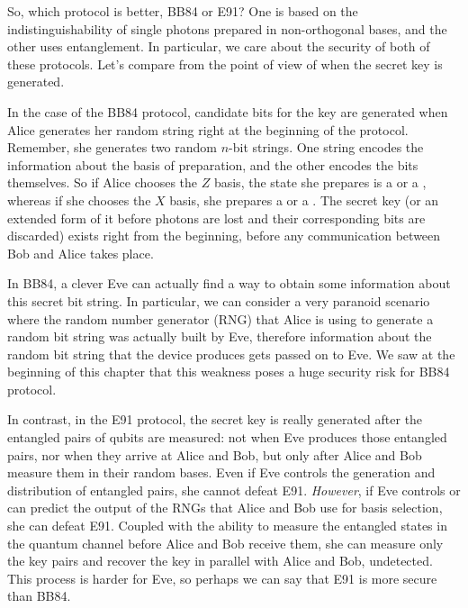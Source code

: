 So, which protocol is better, BB84 or E91?
One is based on the indistinguishability of single photons prepared in non-orthogonal bases, and the other uses entanglement.
In particular, we care about the security of both of these protocols. Let's compare from the point of view of when the secret key is generated.

In the case of the BB84 protocol, candidate bits for the key are generated when Alice generates her random string right at the beginning of the protocol.
Remember, she generates two random $n$-bit strings.
One string encodes the information about the basis of preparation, and the other encodes the bits themselves.
So if Alice chooses the $Z$ basis, the state she prepares is a  or a , whereas if she chooses the $X$ basis, she prepares a \ket{+} or a \ket{-}.
The secret key (or an extended form of it before photons are lost and their corresponding bits are discarded) exists right from the beginning, before any communication between Bob and Alice takes place.

In BB84, a clever Eve can actually find a way to obtain some information about this secret bit string. In particular, we can consider a very paranoid scenario where the random number generator (RNG) that Alice is using to generate a random bit string was actually built by Eve, therefore information about the random bit string that the device produces gets passed on to Eve. We saw at the beginning of this chapter that this weakness poses a huge security risk for BB84 protocol.

In contrast, in the E91 protocol, the secret key is really generated after the entangled pairs of qubits are measured: not when Eve produces those entangled pairs, nor when they arrive at Alice and Bob, but only after Alice and Bob measure them in their random bases. Even if Eve controls the generation and distribution of entangled pairs, she cannot defeat E91. \emph{However}, if Eve controls or can predict the output of the RNGs that Alice and Bob use for basis selection, she can defeat E91. Coupled with the ability to measure the entangled states in the quantum channel before Alice and Bob receive them, she can measure only the key pairs and recover the key in parallel with Alice and Bob, undetected. This process is harder for Eve, so perhaps we can say that E91 is more secure than BB84.

